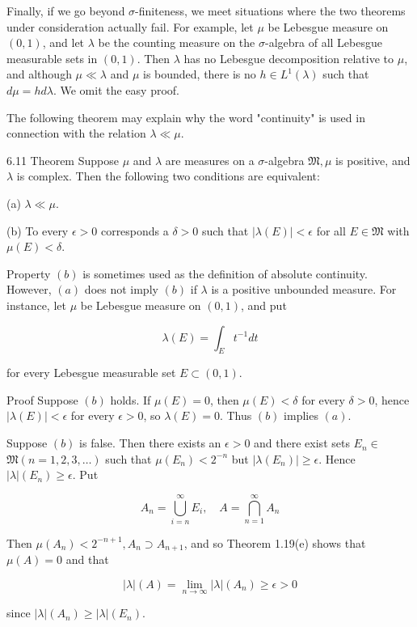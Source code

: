 \documentclass[10pt]{article}
\begin{document}
Finally, if we go beyond $\sigma$-finiteness, we meet situations where the two theorems under consideration actually fail. For example, let $\mu$ be Lebesgue measure on $(0,1)$, and let $\lambda$ be the counting measure on the $\sigma$-algebra of all Lebesgue
measurable sets in $(0,1)$. Then $\lambda$ has no Lebesgue decomposition relative to $\mu$, and although $\mu \ll \lambda$ and $\mu$ is bounded, there is no $h \in L^{1}(\lambda)$ such that $d \mu=h d \lambda$. We omit the easy proof.

The following theorem may explain why the word "continuity" is used in connection with the relation $\lambda \ll \mu$.

6.11 Theorem Suppose $\mu$ and $\lambda$ are measures on a $\sigma$-algebra $\mathfrak{M}, \mu$ is positive, and $\lambda$ is complex. Then the following two conditions are equivalent:

(a) $\lambda \ll \mu$.

(b) To every $\epsilon>0$ corresponds a $\delta>0$ such that $|\lambda(E)|<\epsilon$ for all $E \in \mathfrak{M}$ with $\mu(E)<\delta$.

Property $(b)$ is sometimes used as the definition of absolute continuity. However, $(a)$ does not imply $(b)$ if $\lambda$ is a positive unbounded measure. For instance, let $\mu$ be Lebesgue measure on $(0,1)$, and put

$$
\lambda(E)=\int_{E} t^{-1} d t
$$

for every Lebesgue measurable set $E \subset(0,1)$.

Proof Suppose $(b)$ holds. If $\mu(E)=0$, then $\mu(E)<\delta$ for every $\delta>0$, hence $|\lambda(E)|<\epsilon$ for every $\epsilon>0$, so $\lambda(E)=0$. Thus $(b)$ implies $(a)$.

Suppose $(b)$ is false. Then there exists an $\epsilon>0$ and there exist sets $E_{n} \in$ $\mathfrak{M}(n=1,2,3, \ldots)$ such that $\mu\left(E_{n}\right)<2^{-n}$ but $\left|\lambda\left(E_{n}\right)\right| \geq \epsilon$. Hence $|\lambda|\left(E_{n}\right) \geq \epsilon$. Put

$$
A_{n}=\bigcup_{i=n}^{\infty} E_{i}, \quad A=\bigcap_{n=1}^{\infty} A_{n}
$$

Then $\mu\left(A_{n}\right)<2^{-n+1}, A_{n} \supset A_{n+1}$, and so Theorem 1.19(e) shows that $\mu(A)=0$ and that

$$
|\lambda|(A)=\lim _{n \rightarrow \infty}|\lambda|\left(A_{n}\right) \geq \epsilon>0
$$

since $|\lambda|\left(A_{n}\right) \geq|\lambda|\left(E_{n}\right)$.
\end{document}
